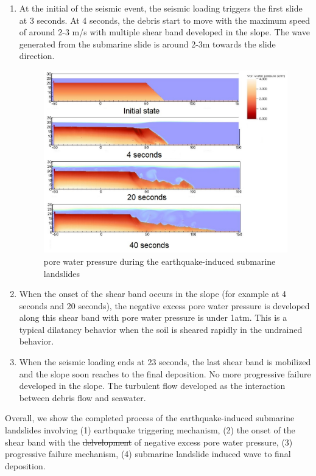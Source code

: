 \documentclass[preprint,12pt]{elsarticle}
\providecommand{\DIFadd}[1]{{\protect\color{blue}\uwave{#1}}} %
\providecommand{\DIFdel}[1]{{\protect\color{red}\sout{#1}}}                      %
\providecommand{\DIFaddbegin}{} %
\providecommand{\DIFaddend}{} %
\providecommand{\DIFdelbegin}{} %
\providecommand{\DIFdelend}{} %
\newcommand{\DIFscaledelfig}{0.5}
\newlength{\DIFdelgraphicswidth} %
\newlength{\DIFdelgraphicsheight} %
\newcommand{\DIFaddincludegraphics}[2][]{{\color{blue}\fbox{\DIFOincludegraphics[#1]{#2}}}} %
\newcommand{\DIFdelincludegraphics}[2][]{%
\sbox{\DIFdelgraphicsbox}{\DIFOincludegraphics[#1]{#2}}%
\settoboxwidth{\DIFdelgraphicswidth}{\DIFdelgraphicsbox} %
\settoboxtotalheight{\DIFdelgraphicsheight}{\DIFdelgraphicsbox} %
\scalebox{\DIFscaledelfig}{%
\parbox[b]{\DIFdelgraphicswidth}{\usebox{\DIFdelgraphicsbox}\\[-\baselineskip] \rule{\DIFdelgraphicswidth}{0em}}\llap{\resizebox{\DIFdelgraphicswidth}{\DIFdelgraphicsheight}{%
\setlength{\unitlength}{\DIFdelgraphicswidth}%
\begin{picture}(1,1)%
\thicklines\linethickness{2pt} %
{\color[rgb]{1,0,0}\put(0,0){\framebox(1,1){}}}%
{\color[rgb]{1,0,0}\put(0,0){\line( 1,1){1}}}%
{\color[rgb]{1,0,0}\put(0,1){\line(1,-1){1}}}%
\end{picture}%
}\hspace*{3pt}}} %
} %
\DeclareRobustCommand{\DIFaddbegin}{\DIFOaddbegin \let\includegraphics\DIFaddincludegraphics} %
\DeclareRobustCommand{\DIFaddend}{\DIFOaddend \let\includegraphics\DIFOincludegraphics} %
\DeclareRobustCommand{\DIFdelbegin}{\DIFOdelbegin \let\includegraphics\DIFdelincludegraphics} %
\DeclareRobustCommand{\DIFdelend}{\DIFOaddend \let\includegraphics\DIFOincludegraphics} %
\begin{document}
\DIFdelend \begin{enumerate}
\item At the initial of the seismic event, the seismic loading triggers the first slide at 3 seconds. At 4 seconds, the debris start to move with the maximum speed of around 2-3 m/s with multiple shear band developed in the slope. The wave generated from the submarine slide is around 2-3m towards the slide direction.
%
\begin{figure}[H]
\center
\includegraphics[scale=0.5]{PWP.jpeg}
\caption{pore water pressure during the earthquake-induced submarine landslides}
\label{fig:PWP}
\end {figure}
%
%
\item When the onset of the shear band occurs in the slope (for example at 4 seconds and 20 seconds), the negative excess pore water pressure is developed along this shear band with pore water pressure is under 1atm. This is a typical dilatancy behavior when the soil is sheared rapidly in the undrained behavior. 
\item  When the seismic loading ends at 23 seconds, the last shear band is mobilized and the slope soon reaches to the final deposition. No more progressive failure developed in the slope. The turbulent flow developed as the interaction between debris flow and seawater.
\end {enumerate}
%
Overall, we show the completed process of the earthquake-induced submarine landslides involving (1) earthquake triggering mechanism, (2) the onset of the shear band with the \DIFdelbegin \DIFdel{delvelopment }\DIFdelend \DIFaddbegin \DIFadd{development }\DIFaddend of negative excess pore water pressure, (3) progressive failure mechanism, (4) submarine landslide induced wave to final deposition.
\end{document}
